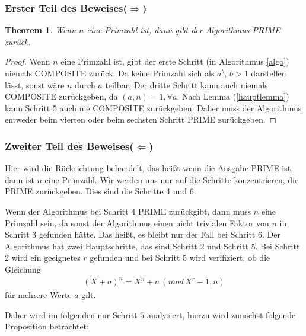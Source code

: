 \documentclass[12pt,oneside]{article}
\newtheorem{theorem}{Theorem}[section]
\theoremstyle{remark}
\theoremstyle{definition}
\begin{document}
\subsubsection{Erster Teil des Beweises($\Rightarrow$)}
\begin{theorem}\label{hin_rich}
Wenn $n$ eine Primzahl ist, dann gibt der Algorithmus PRIME zurück.
\end{theorem}

\begin{proof}
Wenn $n$ eine Primzahl ist, gibt der erste Schritt (in Algorithmus \ref{algo}) niemals COMPOSITE zurück. Da keine Primzahl sich als $a^b, \, b > 1$ darstellen lässt, sonst wäre $n$ durch $a$ teilbar. Der dritte Schritt kann auch niemals COMPOSITE zurückgeben, da $(a,n) = 1, \forall a$. Nach Lemma (\ref{hauptlemma}) kann Schritt 5 auch nie COMPOSITE zurückgeben. Daher muss der Algorithmus entweder beim vierten oder beim sechsten Schritt PRIME zurückgeben.  
\end{proof}

\subsubsection{Zweiter Teil des Beweises($\Leftarrow$)}

Hier wird die Rückrichtung behandelt, das heißt wenn die Ausgabe PRIME ist, dann ist $n$ eine Primzahl. Wir werden uns nur auf die Schritte konzentrieren, die PRIME zurückgeben. Dies sind die Schritte 4 und 6.\newline

Wenn der Algorithmus bei Schritt 4 PRIME zurückgibt, dann muss $n$ eine Primzahl sein, da sonst der Algorithmus einen nicht trivialen Faktor von $n$ in Schritt 3 gefunden hätte. Das heißt, es bleibt nur der Fall bei Schritt 6. Der Algorithmus hat zwei Hauptschritte, das sind Schritt 2 und Schritt 5. Bei Schritt 2 wird ein geeignetes $r$ gefunden und bei Schritt 5 wird verifiziert, ob die Gleichung
\begin{align*}
    (X + a)^n = X^n + a \, (mod  \, X^r - 1, n)
\end{align*}
für mehrere Werte $a$ gilt.\newline

\smallskip



\smallskip



Daher wird im folgenden nur Schritt $5$ analysiert, hierzu wird zunächst folgende Proposition betrachtet:
\end{document}
